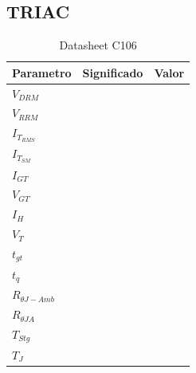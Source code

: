 \subsection{TRIAC}
\begin{table}[H]
  \begin{center}
    \begin{tabular}[c]{l|l|c}
      Parametro  &Significado &Valor \\
      \hline
      $V_{DRM}$           &    &  \\
      $V_{RRM}$           &    &  \\
      $I_{T_{RMS}}$       &    &  \\
      $I_{T_{SM}}$        &    &  \\
      $I_{GT}$            &    &  \\
      $V_{GT}$            &    &  \\
      $I_{H}$             &    &  \\
      $V_{T}$             &    &  \\
      $t_{gt}$            &    &  \\
      $t_{q}$             &    &  \\
      $R_{\theta J-Amb}$  &    &  \\
      $R_{\theta JA}$     &    &  \\
      $T_{Stg}$           &    &  \\
      $T_{J}$             &    &  
    \end{tabular}
  \end{center}
\caption{Datasheet C106}
\end{table}



